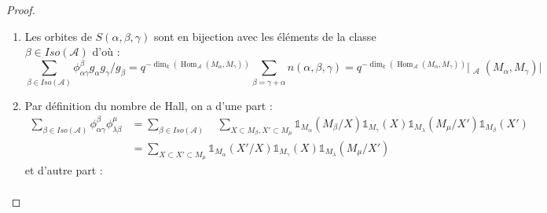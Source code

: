 \documentclass[12pt]{article}
\DeclareMathOperator{\aut}{Aut}
\DeclareMathOperator{\Hom}{Hom}
\DeclareMathOperator{\ext}{Ext^{1}}
\theoremstyle{definition}
\begin{document}
\begin{proof}
\begin{enumerate}
On fait ensuite agir $\aut(M_{\beta})$ de cardinal $g_{\beta}$ sur $S(\alpha,\beta,\gamma)$ selon le diagramme commutatif suivant : soit $\phi\in \aut(M_{\beta})$,
$$\xymatrix{
      & 0\ar[r] & M_{\gamma} \ar[r]^{f}  \ar[d]^{Id} & M_{\beta} \ar[r]^{g}\ar[d]^{\phi} & M_{\alpha}\ar[d]^{Id}\ar[r] & 0 & \\
     & 0\ar[r] & M_{\gamma} \ar[r]^{\phi f} & M_{\beta} \ar[r]^{g\phi^{-1}}& M_{\alpha}\ar[r] & 0 &
  }$$\\
D'après le fait précédent $Stab_{(f,g)}(G_\beta)=|\Hom_{\mathcal{A}}(M_{\alpha},M_{\gamma})|$, la formule des orbites donne alors $\vert \aut(M_{\beta})/Stab_{(f,g)}(G_\beta)\vert = \vert \aut(M_{\beta})\cdot (f,g)\vert = g_{\beta}/|\Hom_{\mathcal{A}}(M_{\alpha},M_{\gamma})|$. Ainsi la taille des orbites ne dépend pas du couple $(f,g)$ et comme $S(\alpha,\beta,\gamma)$ est partitionnée par ses orbites sous l'action de $G_{\beta}$ il vient : $$\vert S(\alpha,\beta,\gamma)\vert = n(\alpha,\beta,\gamma)g_{\beta}/|\Hom_{\mathcal{A}}(M_{\alpha},M_{\gamma})|= n(\alpha,\beta,\gamma)g_{\beta}q^{-\dim_{k}(\Hom_{\mathcal{A}}(M_{\alpha},M_{\gamma}))}$$ où $n(\alpha,\beta,\gamma)$ est le nombre d'orbites de $S(\alpha,\beta,\gamma)$ sous l'action de $\aut(M_{\beta})$, l'entier recherché dans (3) est donc $n(\alpha,\beta,\gamma)$.\\
\item Les orbites de $S(\alpha,\beta,\gamma)$ sont en bijection avec les éléments de la classe $\beta\in Iso(\mathcal{A})$ d'où :
$$\underset{\beta\in Iso(\mathcal{A})}\sum\phi^{\beta}_{\alpha\gamma}g_{\alpha}g_{\gamma}/g_{\beta}=q^{-\dim_{k}(\Hom_{\mathcal{A}}(M_{\alpha},M_{\gamma}))}\underset{\beta=\gamma +\alpha}\sum n(\alpha,\beta,\gamma)=q^{-\dim_{k}(\Hom_{\mathcal{A}}(M_{\alpha},M_{\gamma}))}\vert \ext_{\mathcal{A}}(M_{\alpha},M_{\gamma})\vert $$
\item Par définition du nombre de Hall, on a d'une part : \begin{align*}
    \underset{\beta\in Iso(\mathcal{A})}\sum \phi^{\beta}_{\alpha\gamma}\phi^{\mu}_{\lambda\beta}& =  \underset{\beta\in Iso(\mathcal{A})}\sum\quad\underset{X\subset M_{\beta}, X'\subset M_{\mu}}\sum\mathds{1}_{M_{\alpha}}(M_{\beta}/X)\mathds{1}_{M_{\gamma}}(X)\mathds{1}_{M_{\lambda}}(M_{\mu}/X')\mathds{1}_{M_{\beta}}(X')\\
   & =  \underset{X\subset X'\subset M_{\mu}}\sum\mathds{1}_{M_{\alpha}}(X'/X)\mathds{1}_{M_{\gamma}}(X)\mathds{1}_{M_{\lambda}}(M_{\mu}/X')
\end{align*}
et d'autre part : \begin{align*}

\end{align*}
\end{enumerate}
\end{proof}
\end{document}

